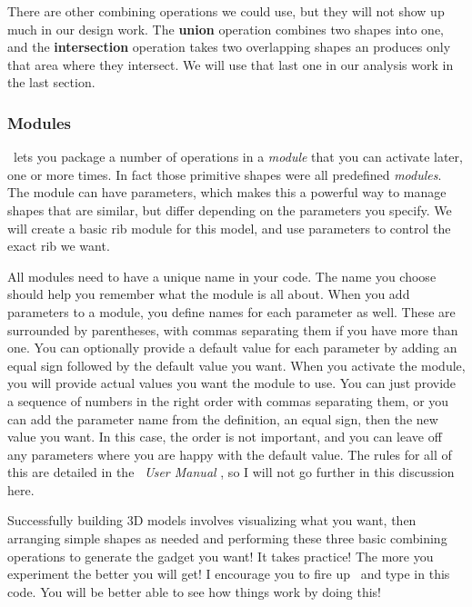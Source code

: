 There are other combining operations we could use, but they will not show up
much in our design work. The {\bf union} operation combines two shapes into
one, and the {\bf intersection} operation takes two overlapping shapes an
produces only that area where they intersect. We will use that last one in our
analysis work in the last section.

\subsubsection{Modules}

\osc\ lets you package a number of operations in a {\it module} that you can
activate later, one or more times. In fact those primitive shapes were all
predefined {\it modules}. The module can have parameters, which makes this a
powerful way to manage shapes that are similar, but differ depending on the
parameters you specify.  We will create a basic rib module for this model, and
use parameters to control the exact rib we want.

All modules need to have a unique name in your code.  The name you choose should
help you remember what the module is all about. When you add parameters to a
module, you define names for each parameter as well. These are surrounded by
parentheses, with commas separating them if you have more than one. You can
optionally provide a default value for each parameter by adding an equal sign
followed by the default value you want. When you activate the module, you will
provide actual values you want the module to use. You can just provide a
sequence of numbers in the right order with commas separating them, or you can
add the parameter name from the definition, an equal sign, then the new value
you want. In this case, the order is not important, and you can leave off any
parameters where you are happy with the default value.  The rules for all of
this are detailed in the \osc\ {\it User Manual} \cite{userman}, so I will not
go further in this discussion here.

Successfully building 3D models involves visualizing what you want, then
arranging simple shapes as needed and performing these three basic combining
operations to generate the gadget you want! It takes practice! The more you
experiment the better you will get! I encourage you to fire up \osc\ and type
in this code. You will be better able to see how things work by doing this!

